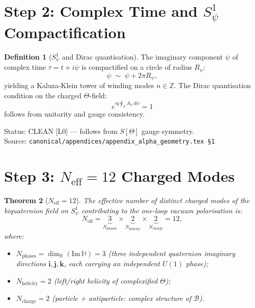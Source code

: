 \documentclass[12pt,a4paper]{article}
\newtheorem{theorem}{Theorem}[section]
\theoremstyle{definition}
\newtheorem{definition}[theorem]{Definition}
\theoremstyle{remark}
\begin{document}
\section{Step 2: Complex Time and $S^1_\psi$ Compactification}
\label{sec:ar:compactification}

\begin{definition}[$S^1_\psi$ and Dirac quantisation]
\label{def:ar:S1psi}
The imaginary component $\psi$ of complex time $\tau = t + i\psi$ is
compactified on a circle of radius $R_\psi$:
\begin{equation}
  \psi \;\sim\; \psi + 2\pi R_\psi,
  \label{eq:ar:Rpsi_circle}
\end{equation}
yielding a Kaluza-Klein tower of winding modes $n \in \mathbb{Z}$.
The Dirac quantisation condition on the charged $\Theta$-field:
\begin{equation}
  e^{iq\oint_\psi A_\psi\,d\psi} = 1
  \label{eq:ar:dirac}
\end{equation}
follows from unitarity and gauge consistency.
\end{definition}

\begin{resultbox}
Status: CLEAN [L0] — follows from $S[\Theta]$ gauge symmetry.\\
Source: \texttt{canonical/appendices/appendix\_alpha\_geometry.tex \S1}
\end{resultbox}

\section{Step 3: $N_{\mathrm{eff}} = 12$ Charged Modes}
\label{sec:ar:Neff}

\begin{theorem}[$N_{\mathrm{eff}} = 12$]
\label{thm:ar:Neff}
The effective number of distinct charged modes of the biquaternion field on $S^1_\psi$
contributing to the one-loop vacuum polarisation is:
\begin{equation}
  N_{\mathrm{eff}}
  = \underbrace{3}_{N_{\mathrm{phases}}} \times
    \underbrace{2}_{N_{\mathrm{helicity}}} \times
    \underbrace{2}_{N_{\mathrm{charge}}}
  = 12,
  \label{eq:ar:Neff}
\end{equation}
where:
\begin{itemize}
  \item $N_{\mathrm{phases}} = \dim_{\mathbb{R}}(\mathrm{Im}\,\mathbb{H}) = 3$
        (three independent quaternion imaginary directions $\mathbf{i,j,k}$,
        each carrying an independent $U(1)$ phase);
  \item $N_{\mathrm{helicity}} = 2$ (left/right helicity of complexified $\Theta$);
  \item $N_{\mathrm{charge}} = 2$ (particle + antiparticle: complex structure of $\mathcal{B}$).
\end{itemize}
\end{theorem}
\end{document}
